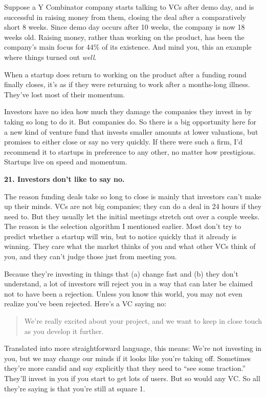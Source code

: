 Suppose a Y Combinator company starts talking to VCs after demo day, and
is successful in raising money from them, closing the deal after a
comparatively short 8 weeks. Since demo day occurs after 10 weeks, the
company is now 18 weeks old. Raising money, rather than working on the
product, has been the company's main focus for 44\% of its existence.
And mind you, this an example where things turned out \emph{well}.

When a startup does return to working on the product after a funding
round finally closes, it's as if they were returning to work after a
months-long illness. They've lost most of their momentum.

Investors have no idea how much they damage the companies they invest in
by taking so long to do it. But companies do. So there is a big
opportunity here for a new kind of venture fund that invests smaller
amounts at lower valuations, but promises to either close or say no very
quickly. If there were such a firm, I'd recommend it to startups in
preference to any other, no matter how prestigious. Startups live on
speed and momentum.

\textbf{21. Investors don't like to say no.}

The reason funding deals take so long to close is mainly that investors
can't make up their minds. VCs are not big companies; they can do a deal
in 24 hours if they need to. But they usually let the initial meetings
stretch out over a couple weeks. The reason is the selection algorithm I
mentioned earlier. Most don't try to predict whether a startup will win,
but to notice quickly that it already is winning. They care what the
market thinks of you and what other VCs think of you, and they can't
judge those just from meeting you.

Because they're investing in things that (a) change fast and (b) they
don't understand, a lot of investors will reject you in a way that can
later be claimed not to have been a rejection. Unless you know this
world, you may not even realize you've been rejected. Here's a VC saying
no:

\begin{quote}
We're really excited about your project, and we want to keep in close
touch as you develop it further.
\end{quote}

Translated into more straightforward language, this means: We're not
investing in you, but we may change our minds if it looks like you're
taking off. Sometimes they're more candid and say explicitly that they
need to ``see some traction.'' They'll invest in you if you start to get
lots of users. But so would any VC. So all they're saying is that you're
still at square 1.

